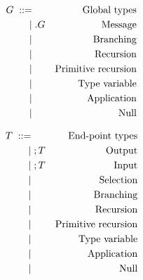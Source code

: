 \documentclass{article}
\begin{document}
\begin{align*}
  G \grmeq & & \text{Global types}\\
    \grmor & \gsendType p{p'}UG    & \text{Message}\\
    \grmor & \gbranchType p{p'}lG  & \text{Branching}\\
    \grmor & \grecurType xG        & \text{Recursion}\\
    \grmor & \gprimrecType GiIx{G'}& \text{Primitive recursion}\\
    \grmor & \grecvarType x        & \text{Type variable}\\
    \grmor & \gappType Gi          & \text{Application}\\
    \grmor & \gendType             & \text{Null}\\
\end{align*}

\begin{align*}
  T \grmeq & & \text{End-point types}\\
    \grmor & \sendType UT          & \text{Output}\\
    \grmor & \recvType UT          & \text{Input}\\
    \grmor & \selectType lT        & \text{Selection}\\
    \grmor & \branchType lt        & \text{Branching}\\
    \grmor & \recurType xT         & \text{Recursion}\\
    \grmor & \primrecType TiIx{T'} & \text{Primitive recursion}\\
    \grmor & \recvarType x         & \text{Type variable}\\
    \grmor & \appType Ti           & \text{Application}\\
    \grmor & \EndType              & \text{Null}\\
\end{align*}
\end{document}

